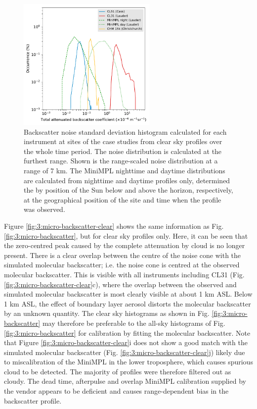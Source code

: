 \begin{figure}[t]
\centering
\includegraphics[width=0.6\textwidth]{chapter3/fig/backscatter_sd_hist.pdf}
\caption[Backscatter noise standard deviation histogram]{
Backscatter noise standard deviation histogram calculated for each instrument
at sites of the case studies from clear sky profiles over the whole time period.
The noise distribution is calculated at the furthest range. Shown is the
range-scaled noise distribution at a range of 7 km. The MiniMPL nighttime and daytime
distributions are calculated from nighttime and daytime profiles only, determined
the by position of the Sun below and above the horizon, respectively, at
the geographical position of the site and time when the profile was observed.
}
\label{fig:3:backscatter-sd-hist}
\end{figure}

Figure \ref{fig:3:micro-backscatter-clear} shows the same information as Fig. \ref{fig:3:micro-backscatter},
but for clear sky profiles only. Here, it can be seen that the zero-centred
peak caused by the complete attenuation by cloud is no longer present.
There is a clear overlap between the centre of the noise cone
with the simulated molecular backscatter; i.e. the noise cone is centred
at the observed molecular backscatter. This is visible with all instruments
including CL31 (Fig. \ref{fig:3:micro-backscatter-clear}c), where the overlap between
the observed and simulated molecular backscatter is most clearly visible at about 1 km ASL.
Below 1 km ASL,
the effect of boundary layer aerosol distorts the molecular backscatter
by an unknown quantity. The clear sky histograms as shown in Fig.
\ref{fig:3:micro-backscatter} may therefore be preferable to the all-sky
histograms of Fig. \ref{fig:3:micro-backscatter} for calibration by fitting 
the molecular backscatter. Note that Figure \ref{fig:3:micro-backscatter-clear}i
does not show a good match with the simulated molecular backscatter (Fig. \ref{fig:3:micro-backscatter-clear}j)
likely due to miscalibration of the MiniMPL in the lower troposphere,
which causes spurious cloud to be detected. The majority of profiles were therefore
filtered out as cloudy. The dead time, afterpulse and overlap MiniMPL
calibration supplied by the vendor appears to be deficient and causes
range-dependent bias in the backscatter profile.

